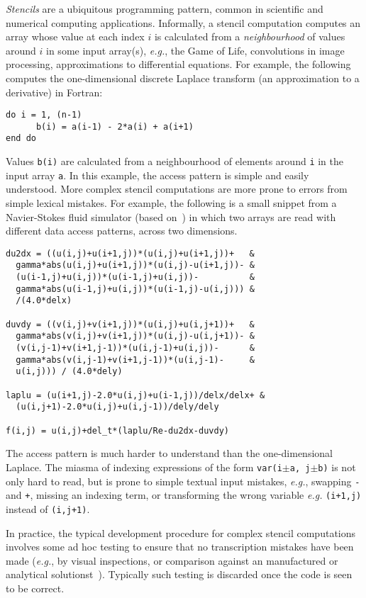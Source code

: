 \documentclass[10pt,preprint]{sigplanconf}
\theoremstyle{definition}
\newcommand{\eg}{\emph{e.g.}}
\begin{document}
\emph{Stencils} are a ubiquitous programming pattern, common in
scientific and numerical computing applications. Informally, a stencil
computation computes an array whose value at each index $i$ is
calculated from a \emph{neighbourhood} of values around $i$ in some
input array(s), \eg{}, the Game of Life, convolutions in image
processing, approximations to differential equations. For example, the
following computes the one-dimensional discrete Laplace transform (an
approximation to a derivative) in Fortran:
%
\begin{verbatim}
do i = 1, (n-1)
      b(i) = a(i-1) - 2*a(i) + a(i+1)
end do
\end{verbatim}
%
Values \texttt{b(i)} are calculated from a neighbourhood of elements
around \texttt{i} in the input array \texttt{a}.  In this example, the
access pattern is simple and easily understood. More complex
stencil computations are more prone to errors from simple lexical
mistakes. For example, the following is a small snippet from a
Navier-Stokes fluid simulator (based on~\citet{griebel1997numerical})
 in which two arrays are read with
different data access patterns, across two dimensions.
\begin{verbatim}
du2dx = ((u(i,j)+u(i+1,j))*(u(i,j)+u(i+1,j))+   &
  gamma*abs(u(i,j)+u(i+1,j))*(u(i,j)-u(i+1,j))- &
  (u(i-1,j)+u(i,j))*(u(i-1,j)+u(i,j))-          &
  gamma*abs(u(i-1,j)+u(i,j))*(u(i-1,j)-u(i,j))) &
  /(4.0*delx)

duvdy = ((v(i,j)+v(i+1,j))*(u(i,j)+u(i,j+1))+   &
  gamma*abs(v(i,j)+v(i+1,j))*(u(i,j)-u(i,j+1))- &
  (v(i,j-1)+v(i+1,j-1))*(u(i,j-1)+u(i,j))-      &
  gamma*abs(v(i,j-1)+v(i+1,j-1))*(u(i,j-1)-     &
  u(i,j))) / (4.0*dely)

laplu = (u(i+1,j)-2.0*u(i,j)+u(i-1,j))/delx/delx+ &
  (u(i,j+1)-2.0*u(i,j)+u(i,j-1))/dely/dely

f(i,j) = u(i,j)+del_t*(laplu/Re-du2dx-duvdy)
\end{verbatim}
The access pattern is much harder to understand than the
one-dimensional Laplace.  The miasma of indexing expressions of the
form \texttt{var(i$\pm$a, j$\pm$b)} is not only hard to read, but is
prone to simple textual input mistakes, \eg{}, swapping \texttt{-} and
\texttt{+}, missing an indexing term, or transforming the wrong
variable \eg{} \texttt{(i+1,j)} instead of \texttt{(i,j+1)}.

In practice, the typical development procedure for complex
stencil computations involves some ad hoc testing to ensure that no
transcription mistakes have been made (\eg{}, by visual
inspections, or comparison against an manufactured or 
analytical solutionst~\cite{farrell2010automated}). Typically such
testing is discarded once the code is seen to be correct.
\end{document}
